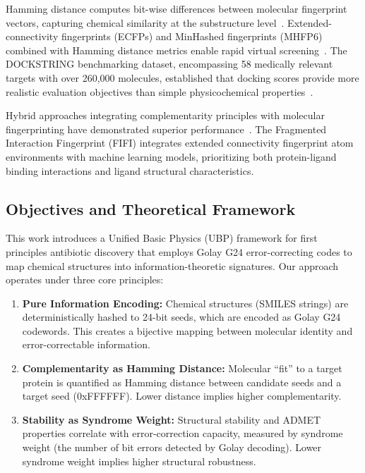 \documentclass[12pt,a4paper]{article}
\begin{document}
Hamming distance computes bit-wise differences between molecular fingerprint vectors, capturing chemical similarity at the substructure level~\cite{Leist2020Fingerprints}. Extended-connectivity fingerprints (ECFPs) and MinHashed fingerprints (MHFP6) combined with Hamming distance metrics enable rapid virtual screening~\cite{Leist2020Fingerprints}. The DOCKSTRING benchmarking dataset, encompassing 58 medically relevant targets with over 260,000 molecules, established that docking scores provide more realistic evaluation objectives than simple physicochemical properties~\cite{Francoeur2022DOCKSTRING}.

Hybrid approaches integrating complementarity principles with molecular fingerprinting have demonstrated superior performance~\cite{Atz2024FIFI}. The Fragmented Interaction Fingerprint (FIFI) integrates extended connectivity fingerprint atom environments with machine learning models, prioritizing both protein-ligand binding interactions and ligand structural characteristics.

\subsection{Objectives and Theoretical Framework}

This work introduces a Unified Basic Physics (UBP) framework for first principles antibiotic discovery that employs Golay G24 error-correcting codes to map chemical structures into information-theoretic signatures. Our approach operates under three core principles:

\begin{enumerate}
\item \textbf{Pure Information Encoding:} Chemical structures (SMILES strings) are deterministically hashed to 24-bit seeds, which are encoded as Golay G24 codewords. This creates a bijective mapping between molecular identity and error-correctable information.

\item \textbf{Complementarity as Hamming Distance:} Molecular ``fit'' to a target protein is quantified as Hamming distance between candidate seeds and a target seed (0xFFFFFF). Lower distance implies higher complementarity.

\item \textbf{Stability as Syndrome Weight:} Structural stability and ADMET properties correlate with error-correction capacity, measured by syndrome weight (the number of bit errors detected by Golay decoding). Lower syndrome weight implies higher structural robustness.

\end{enumerate}
\end{document}

